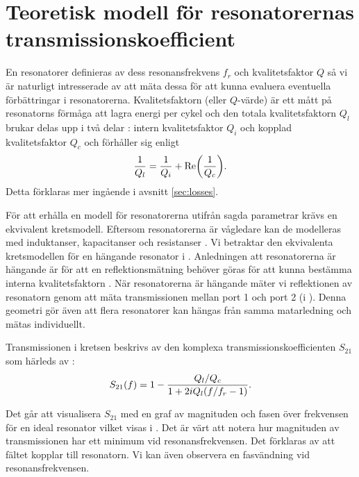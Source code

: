 \documentclass[main.tex]{subfiles}
\begin{document}
\newpage
\section{Teoretisk modell för resonatorernas transmissionskoefficient}
\label{sec:res_teori}


En resonatorer definieras av dess resonansfrekvens $f_r$ och kvalitetsfaktor $Q$ \cite[s. 3]{Boehme2016} så vi är naturligt intresserade av att mäta dessa för att kunna evaluera eventuella förbättringar i resonatorerna. Kvalitetsfaktorn (eller $Q$-värde) är ett mått på resonatorns förmåga att lagra energi per cykel och den totala kvalitetsfaktorn $Q_l$ brukar delas upp i två delar \cite{Probst2015}: intern kvalitetsfaktor $Q_i$ och kopplad kvalitetsfaktor $Q_c$ och förhåller sig enligt 
\begin{equation}
\frac{1}{Q_l}=\frac{1}{Q_i}+\text{Re}\qty(\frac{1}{Q_c}).
\end{equation}
Detta förklaras mer ingående i avsnitt \ref{sec:losses}.

För att erhålla en modell för resonatorerna utifrån sagda parametrar krävs en ekvivalent kretsmodell. Eftersom resonatorerna är vågledare kan de modelleras med induktanser, kapacitanser och resistanser \cite[s. 437]{cheng}. Vi betraktar den ekvivalenta kretsmodellen för en hängande resonator \cite{Boehme2016} i . Anledningen att resonatorerna är hängande är för att en reflektionsmätning behöver göras för att kunna bestämma interna kvalitetsfaktorn \cite{Probst2015}. När resonatorerna är hängande mäter vi reflektionen av resonatorn genom att mäta transmissionen mellan port 1 och port 2 (i ). Denna geometri gör även att flera resonatorer kan hängas från samma matarledning och mätas individuellt.

Transmissionen i kretsen beskrivs av den komplexa transmissionskoefficienten $S_{21}$ som härleds av \citeauthor{Boehme2016} \cite[s. 38]{Boehme2016}:
\begin{equation}
    S_{21}(f)=1-\frac{Q_l/Q_c}{1+2iQ_l\qty(f/f_r-1)}.
\label{eq:S21_ideal}
\end{equation}

Det går att visualisera $S_{21}$ med en graf av magnituden och fasen över frekvensen för en ideal resonator vilket visas i . Det är värt att notera hur magnituden av transmissionen har ett minimum vid resonansfrekvensen. Det förklaras av att fältet kopplar till resonatorn. Vi kan även observera en fasvändning vid resonansfrekvensen.
\end{document}

